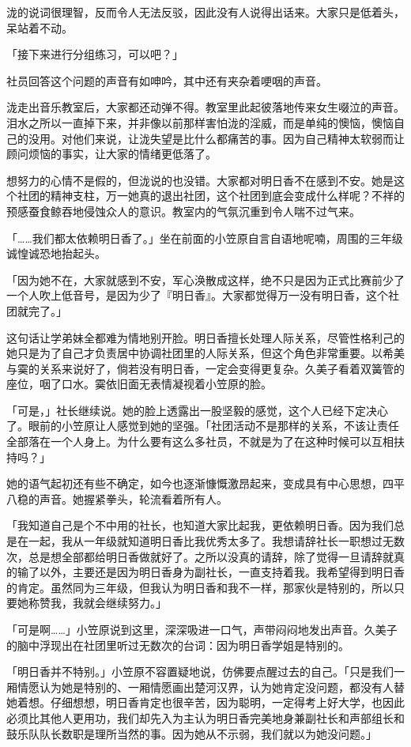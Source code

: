 \documentclass[UTF8]{ctexart}
\begin{document}
    泷的说词很理智，反而令人无法反驳，因此没有人说得出话来。大家只是低着头，呆站着不动。 

    「接下来进行分组练习，可以吧？」 

    社员回答这个问题的声音有如呻吟，其中还有夹杂着哽咽的声音。 

    泷走出音乐教室后，大家都还动弹不得。教室里此起彼落地传来女生啜泣的声音。泪水之所以一直掉下来，并非像以前那样害怕泷的淫威，而是单纯的懊恼，懊恼自己的没用。对他们来说，让泷失望是比什么都痛苦的事。因为自己精神太软弱而让顾问烦恼的事实，让大家的情绪更低落了。 

    想努力的心情不是假的，但泷说的也没错。大家都对明日香不在感到不安。她是这个社团的精神支柱，万一她真的退出社团，这个社团到底会变成什么样呢？不祥的预感蚕食鲸吞地侵蚀众人的意识。教室内的气氛沉重到令人喘不过气来。 

    「……我们都太依赖明日香了。」坐在前面的小笠原自言自语地呢喃，周围的三年级诚惶诚恐地抬起头。 

    「因为她不在，大家就感到不安，军心涣散成这样，绝不只是因为正式比赛前少了一个人吹上低音号，是因为少了『明日香』。大家都觉得万一没有明日香，这个社团就完了。」 

    这句话让学弟妹全都难为情地别开脸。明日香擅长处理人际关系，尽管性格利己的她只是为了自己才负责居中协调社团里的人际关系，但这个角色非常重要。以希美与霙的关系来说好了，倘若没有明日香，一定会变得更复杂。久美子看着双簧管的座位，咽了口水。霙依旧面无表情凝视着小笠原的脸。 

    「可是，」社长继续说。她的脸上透露出一股坚毅的感觉，这个人已经下定决心了。眼前的小笠原让人感觉到她的坚强。「社团活动不是那样的关系，不该让责任全部落在一个人身上。为什么要有这么多社员，不就是为了在这种时候可以互相扶持吗？」 

    她的语气起初还有些不确定，如今也逐渐慷慨激昂起来，变成具有中心思想，四平八稳的声音。她握紧拳头，轮流看着所有人。 

    「我知道自己是个不中用的社长，也知道大家比起我，更依赖明日香。因为我们总是在一起，我从一年级就知道明日香比我优秀太多了。我想请辞社长一职想过无数次，总是想全部都给明日香做就好了。之所以没真的请辞，除了觉得一旦请辞就真的输了以外，主要还是因为明日香身为副社长，一直支持着我。我希望得到明日香的肯定。虽然同为三年级，但我认为明日香和我不一样，那家伙是特别的，所以只要她称赞我，我就会继续努力。」 

    「可是啊……」小笠原说到这里，深深吸进一口气，声带闷闷地发出声音。久美子的脑中浮现出在社团里听过无数次的台词：因为明日香学姐是特别的。 

    「明日香并不特别。」小笠原不容置疑地说，仿佛要点醒过去的自己。「只是我们一厢情愿认为她是特别的、一厢情愿画出楚河汉界，认为她肯定没问题，都没有人替她着想。仔细想想，明日香肯定也很辛苦，因为聪明，一定得考上好大学，也因此必须比其他人更用功，我们却先入为主认为明日香完美地身兼副社长和声部组长和鼓乐队队长数职是理所当然的事。因为她从不示弱，我们就以为她没问题。」 
\end{document}
